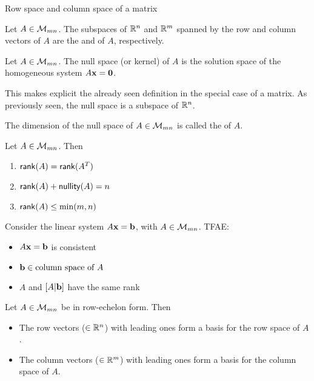 \documentclass[aspectratio=169]{beamer}
\begin{document}
\begin{frame}{Row space and column space of a matrix}
    \begin{definition}\label{def:row_column_spaces}
        Let $A\in\mathcal{M}_{mn}$. The subspaces of $\mathbb{R}^n$ and $\mathbb{R}^m$ spanned by the row and column vectors of $A$ are the  and  of $A$, respectively.
    \end{definition}
    \begin{definition}
        Let $A\in\mathcal{M}_{mn}$. The null space (or kernel) of $A$ is the solution space of the homogeneous system $A\bx=\b0$.
    \end{definition}
    This makes explicit the already seen definition in the special case of a matrix. As previously seen, the null space is a subspace of $\mathbb{R}^n$.
    \begin{definition}[Nullity]
        The dimension of the null space of $A\in\mathcal{M}_{mn}$ is called the  of $A$.
    \end{definition}
\end{frame}

\begin{frame}
    \begin{theorem}
        Let $A\in\mathcal{M}_{mn}$. Then
        \begin{enumerate}
            \item $\mathsf{rank}(A)=\mathsf{rank}(A^T)$
            \item $\mathsf{rank}(A)+\mathsf{nullity}(A)=n$
            \item $\mathsf{rank}(A)\leq\min(m,n)$
        \end{enumerate}
    \end{theorem}
    \vfill
    \begin{theorem}[Consistency]
        Consider the linear system $A\mathbf{x}=\mathbf{b}$, with $A\in\mathcal{M}_{mn}$. TFAE:
        \begin{itemize}
            \item $A\mathbf{x}=\mathbf{b}$ is consistent
            \item $\mathbf{b}\in\text{column space of }A$
            \item $A$ and $[A|\mathbf{b}]$ have the same rank
        \end{itemize}
    \end{theorem}
\end{frame}

\begin{frame}
    \begin{proposition}
        Let $A\in\mathcal{M}_{mn}$ be in row-echelon form. Then
        \begin{itemize}
            \item The row vectors ($\in\mathbb{R}^n$) with leading ones form a basis for the row space of $A$.
            \item The column vectors ($\in\mathbb{R}^m$) with leading ones form a basis for the column space of $A$.
        \end{itemize}
    \end{proposition}
\end{frame}
\end{document}
